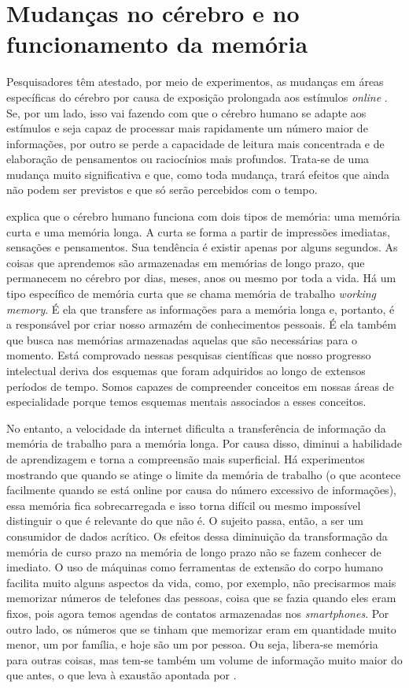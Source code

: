 \section{Mudanças no cérebro e no funcionamento da memória}\label{sec-mudançasnocerebroenofuncionamentodamemoria}

Pesquisadores têm atestado, por meio de experimentos, as mudanças em áreas específicas do cérebro por causa de exposição prolongada aos estímulos \textit{online} \cite{bbc2021}.  Se, por um lado, isso vai fazendo com que o cérebro humano se adapte aos estímulos e seja capaz de processar mais rapidamente um número maior de informações, por outro se perde a capacidade de leitura mais concentrada e de elaboração de pensamentos ou raciocínios mais profundos. Trata-se de uma mudança muito significativa e que, como toda mudança, trará efeitos que ainda não podem ser previstos e que só serão percebidos com o tempo.

\textcite[p. 123]{carr2010} explica que o cérebro humano funciona com dois tipos de memória: uma memória curta e uma memória longa. A curta se forma a partir de impressões imediatas, sensações e pensamentos. Sua tendência é existir apenas por alguns segundos. As coisas que aprendemos são armazenadas em memórias de longo prazo, que permanecem no cérebro por dias, meses, anos ou mesmo por toda a vida. Há um tipo específico de memória curta que se chama memória de trabalho \textit{working memory}. É ela que transfere as informações para a memória longa e, portanto, é a responsável por criar nosso armazém de conhecimentos pessoais. É ela também que busca nas memórias armazenadas aquelas que são necessárias para o momento. Está comprovado nessas pesquisas científicas que nosso progresso intelectual deriva dos esquemas que foram adquiridos ao longo de extensos períodos de tempo. Somos capazes de compreender conceitos em nossas áreas de especialidade porque temos esquemas mentais associados a esses conceitos. 

No entanto, a velocidade da internet dificulta a transferência de informação da memória de trabalho para a memória longa. Por causa disso, diminui a habilidade de aprendizagem e torna a compreensão mais superficial. Há experimentos mostrando que quando se atinge o limite da memória de trabalho (o que acontece facilmente quando se está online por causa do número excessivo de informações), essa memória fica sobrecarregada e isso torna difícil ou mesmo impossível distinguir o que é relevante do que não é. O sujeito passa, então, a ser um consumidor de dados acrítico. Os efeitos dessa diminuição da transformação da memória de curso prazo na memória de longo prazo não se fazem conhecer de imediato. O uso de máquinas como ferramentas de extensão do corpo humano facilita muito alguns aspectos da vida, como, por exemplo, não precisarmos mais memorizar números de telefones das pessoas, coisa que se fazia quando eles eram fixos, pois agora temos agendas de contatos armazenadas nos \textit{smartphones}. Por outro lado, os números que se tinham que memorizar eram em quantidade muito menor, um por família, e hoje são um por pessoa. Ou seja, libera-se memória para outras coisas, mas tem-se também um volume de informação muito maior do que antes, o que leva à exaustão apontada por \textcite{carr2010}. 

